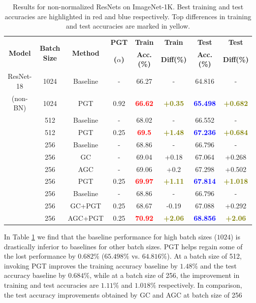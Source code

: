 \documentclass[runningheads]{llncs}
\begin{document}
\begin{table}[!t]
\centering
\caption{ Results for non-normalized ResNets on ImageNet-1K. Best training and test
accuracies are highlighted in red and blue respectively. Top differences in training and
test accuracies are marked in yellow. }
\label{tab:wobn_table}
\begin{tabular}{cccccccc}
\multirow{2}{*}{\textbf{Model}} & \multirow{2}{*}{\textbf{Batch Size}} &
\multirow{2}{*}{\textbf{Method}} & \textbf{PGT} & \textbf{Train}
& \textbf{Train} & \textbf{Test} & \textbf{Test} \\
& & & \textbf{($\alpha$)} & \textbf{Acc.(\%)} & \textbf{Diff(\%)} &
\textbf{Acc.(\%)} & \textbf{Diff(\%)} \\
\midrule
ResNet-18 & 1024 & Baseline & - & 66.27 & - & 64.816 & - \\
(non-BN) & 1024 & PGT & 0.92 & \textcolor{red}{\textbf{66.62}} &
\textcolor{olive}{\textbf{+0.35}} & \textcolor{blue}{\textbf{65.498}} &
\textcolor{olive}{\textbf{+0.682}} \\
\cmidrule{2-8}
& 512 & Baseline & - & 68.02 & - & 66.552 & - \\
& 512 & PGT & 0.25 & \textcolor{red}{\textbf{69.5}} & \textcolor{olive}{\textbf{+1.48}}
& \textcolor{blue}{\textbf{67.236}} & \textcolor{olive}{\textbf{+0.684}} \\
\cmidrule{2-8}
& 256 & Baseline & - & 68.86 & - & 66.796 & - \\
& 256 & GC & - & 69.04 & +0.18 & 67.064 & +0.268 \\
& 256 & AGC & - & 69.06 & +0.2 & 67.298 & +0.502 \\
& 256 & PGT & 0.25 & \textcolor{red}{\textbf{69.97}} & \textcolor{olive}{\textbf{+1.11}}
& \textcolor{blue}{\textbf{67.814}} & \textcolor{olive}{\textbf{+1.018}} \\
\cmidrule{2-8}
& 256 & Baseline & - & 68.86 & - & 66.796 & - \\
& 256 & GC+PGT & 0.25 & 68.67 & -0.19 & 67.088 & +0.292 \\
& 256 & AGC+PGT & 0.25 & \textcolor{red}{\textbf{70.92}} &
\textcolor{olive}{\textbf{+2.06}} & \textcolor{blue}{\textbf{68.856}} &
\textcolor{olive}{\textbf{+2.06}} \\
\end{tabular}
\vspace{-0.5cm}
\end{table}




In Table \ref{tab:wobn_table} we find that the baseline performance for high batch sizes
($1024$) is drastically inferior to baselines for other batch sizes. PGT helps regain
some of the lost performance by $0.682\%$ ($65.498\%$ vs. $64.816\%$). At a batch size
of 512, invoking PGT improves the training accuracy baseline by $1.48\%$ and the test
accuracy baseline by $0.684\%$, while at a batch size of 256, the improvement in
training and test accuracies are $1.11\%$ and $1.018\%$ respectively. In comparison, the
test accuracy improvements obtained by GC and AGC at batch size of 256
\end{document}
